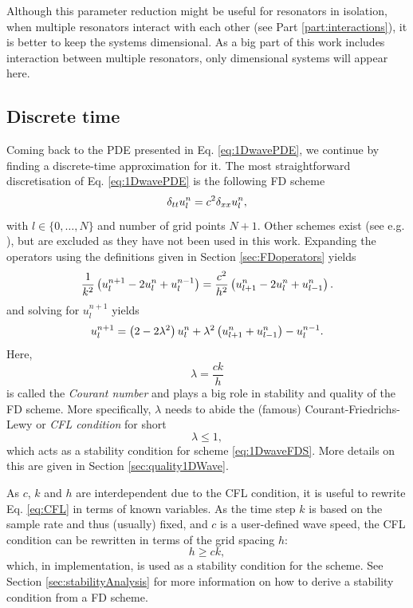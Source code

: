 Although this parameter reduction might be useful for resonators in isolation, when multiple resonators interact with each other (see Part \ref{part:interactions}), it is better to keep the systems dimensional. As a big part of this work includes interaction between multiple resonators, only dimensional systems will appear here.

\subsection{Discrete time}\label{sec:1DWaveDisc}
Coming back to the PDE presented in Eq. \eqref{eq:1DwavePDE}, we continue by finding a discrete-time approximation for it. The most straightforward  discretisation of Eq. \eqref{eq:1DwavePDE} is the following FD scheme
\begin{equation}\label{eq:1DwaveFDS}
    \delta_{tt} u_l^n = c^2 \delta_{xx} u_l^n,
\end{equation}
with $l\in\{0, \hdots, N\}$ and number of grid points $N + 1$.
Other schemes exist (see e.g. \cite{theBible}), but are excluded as they have not been used in this work. Expanding the operators using the definitions given in Section \ref{sec:FDoperators} yields
\begin{equation}
    \frac{1}{k^2}\left(u_l^{n+1}-2 u_l^n + u_l^{n-1}\right) = \frac{c^2}{h^2} \left(u_{l+1}^n - 2 u_l^n + u_{l-1}^n\right).
\end{equation}
and solving for $u_l^{n+1}$ yields
\begin{equation}\label{eq:1DwaveUpdate}
    u_l^{n+1} = \left(2-2\lambda^2\right) u_l^n  + \lambda^2\left(u_{l+1}^n + u_{l-1}^n\right) - u_l^{n-1}.
\end{equation}
Here, 
\begin{equation}\label{eq:courantNumber}
    \lambda = \frac{ck}{h}
\end{equation}
is called the \textit{Courant number} and plays a big role in stability and quality of the FD scheme. More specifically, $\lambda$ needs to abide the (famous) Courant-Friedrichs-Lewy or \textit{CFL condition} for short \cite{Courant1928}
\begin{equation}\label{eq:CFL}
    \lambda \leq 1,
\end{equation}
which acts as a stability condition for scheme \eqref{eq:1DwaveFDS}. More details on this are given in Section \ref{sec:quality1DWave}.

As $c$, $k$ and $h$ are interdependent due to the CFL condition, it is useful to rewrite Eq. \eqref{eq:CFL} in terms of known variables.
As the time step $k$ is based on the sample rate and thus (usually) fixed, and $c$ is a user-defined wave speed, the CFL condition can be rewritten in terms of the grid spacing $h$:
\begin{equation}\label{eq:1DWaveStabilityCond}
    h \geq ck,
\end{equation}
%
which, in implementation, is used as a stability condition for the scheme. See Section \ref{sec:stabilityAnalysis} for more information on how to derive a stability condition from a FD scheme.

